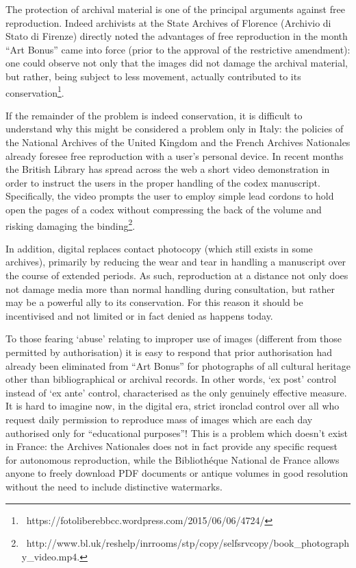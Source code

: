\documentclass[amsthm,ebook]{saparticle}
\begin{document}
The protection of archival material is one of the principal arguments against free reproduction. Indeed archivists at
the State Archives of Florence (Archivio di Stato di Firenze) directly noted the advantages of free reproduction in the
month “Art Bonus” came into force (prior to the approval of the restrictive amendment): one could observe not only that
the images did not damage the archival material, but rather, being subject to less movement, actually contributed to
its conservation\footnote{\ https://fotoliberebbcc.wordpress.com/2015/06/06/4724/}.

If the remainder of the problem is indeed conservation, it is difficult to understand why this might be considered a
problem only in Italy: the policies of the National Archives of the United Kingdom and the French Archives Nationales
already foresee free reproduction with a user’s personal device. In recent months the British Library has spread across
the web a short video demonstration in order to instruct the users in the proper handling of the codex manuscript.
Specifically, the video prompts the user to employ simple lead cordons to hold open the pages of a codex without
compressing the back of the volume and risking damaging the
binding\footnote{\ http://www.bl.uk/reshelp/inrrooms/stp/copy/selfsrvcopy/book\_photography\_video.mp4.}. 

In addition, digital replaces contact photocopy (which still exists in some archives), primarily by reducing the wear
and tear in handling a manuscript over the course of extended periods. As such, reproduction at a distance not only
does not damage media more than normal handling during consultation, but rather may be a powerful ally to its
conservation. For this reason it should be incentivised and not limited or in fact denied as happens today. 

To those fearing ‘abuse’ relating to improper use of images (different from those permitted by authorisation) it is easy
to respond that prior authorisation had already been eliminated from “Art Bonus” for photographs of all cultural
heritage other than bibliographical or archival records. In other words, ‘ex post’ control instead of ‘ex ante’
control, characterised as the only genuinely effective measure. It is hard to imagine now, in the digital era, strict
ironclad control over all who request daily permission to reproduce mass of images which are each day authorised only
for “educational purposes”! This is a problem which doesn’t exist in France: the Archives Nationales does not in fact
provide any specific request for autonomous reproduction, while the Bibliothéque National de France allows anyone to
freely download PDF documents or antique volumes in good resolution without the need to include distinctive watermarks.
\end{document}
